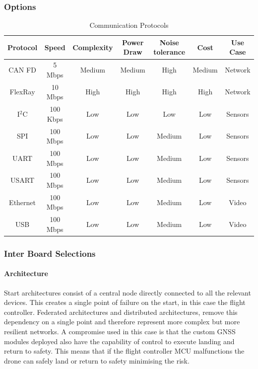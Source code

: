 \subsubsection{Options}
\begin{table}[]
        \centering
        \begin{tabular}{|c|c|c|c|c|c|c|} 
         \textbf{Protocol} & \textbf{Speed} & \textbf{Complexity} &\textbf{Power Draw} &\textbf{Noise tolerance} &\textbf{Cost} & \textbf{Use Case}\\
         \hline
         CAN FD & 5 Mbps & Medium & Medium  & High & Medium & Network\\
         FlexRay   & 10 Mbps & High & High  & High & High & Network\\
         I$^2$C & 100 Kbps & Low & Low & Low & Low & Sensors\\
         SPI & 100 Mbps & Low & Low & Medium & Low & Sensors\\
         UART & 100 Mbps & Low & Low & Medium & Low & Sensors\\
         USART & 100 Mbps & Low & Low & Medium & Low & Sensors\\
          Ethernet & 100 Mbps & Low & Low & Medium & Low & Video\\
         USB & 100 Mbps & Low & Low & Medium & Low & Video\\
         \hline
        \end{tabular}
        \caption{Communication Protocols}
        \label{tab:communication_options}
    \end{table}

\subsubsection{Inter Board Selections}
\paragraph{Architecture}
Start architectures consist of a central node directly connected to all the relevant devices. This creates a single point of failure on the start, in this case the flight controller. Federated architectures and distributed architectures, remove this dependency on a single point and therefore represent more complex but more resilient networks. A compromise used in this case is that the custom \gls{GNSS} modules deployed also have the capability of control to execute landing and return to safety. This means that if the flight controller \gls{MCU} malfunctions the drone can safely land or return to safety minimising the risk.  
